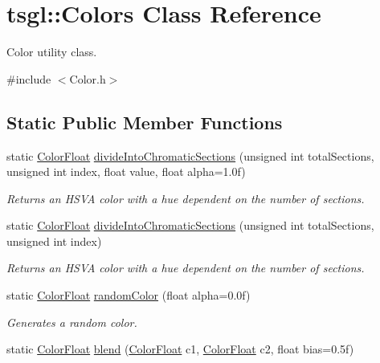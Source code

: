 \hypertarget{classtsgl_1_1_colors}{\section{tsgl\-:\-:Colors Class Reference}
\label{classtsgl_1_1_colors}
}


Color utility class.  




{\ttfamily \#include $<$Color.\-h$>$}

\subsection*{Static Public Member Functions}
\begin{DoxyCompactItemize}
\item 
static \hyperlink{structtsgl_1_1_color_float}{Color\-Float} \hyperlink{classtsgl_1_1_colors_af610e20b5176294e24fdae4af4f5d6dc}{divide\-Into\-Chromatic\-Sections} (unsigned int total\-Sections, unsigned int index, float value, float alpha=1.\-0f)
\begin{DoxyCompactList}\small\item\em Returns an H\-S\-V\-A color with a hue dependent on the number of sections. \end{DoxyCompactList}\item 
static \hyperlink{structtsgl_1_1_color_float}{Color\-Float} \hyperlink{classtsgl_1_1_colors_ab9c66054f181ca5db5839ede985fb112}{divide\-Into\-Chromatic\-Sections} (unsigned int total\-Sections, unsigned int index)
\begin{DoxyCompactList}\small\item\em Returns an H\-S\-V\-A color with a hue dependent on the number of sections. \end{DoxyCompactList}\item 
static \hyperlink{structtsgl_1_1_color_float}{Color\-Float} \hyperlink{classtsgl_1_1_colors_a0f28a13af4a0fc352a250c23ecc97e4f}{random\-Color} (float alpha=0.\-0f)
\begin{DoxyCompactList}\small\item\em Generates a random color. \end{DoxyCompactList}\item 
static \hyperlink{structtsgl_1_1_color_float}{Color\-Float} \hyperlink{classtsgl_1_1_colors_a26a34b86c0b70fe4984a91a24a0f263f}{blend} (\hyperlink{structtsgl_1_1_color_float}{Color\-Float} c1, \hyperlink{structtsgl_1_1_color_float}{Color\-Float} c2, float bias=0.\-5f)

\end{DoxyCompactItemize}
